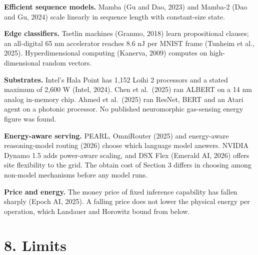 \documentclass[10pt,letterpaper]{article}
\begin{document}
\textbf{Efficient sequence models.} Mamba (Gu and Dao, 2023) and Mamba-2
(Dao and Gu, 2024) scale linearly in sequence length with constant-size
state.

\textbf{Edge classifiers.} Tsetlin machines (Granmo, 2018) learn
propositional clauses; an all-digital 65 nm accelerator reaches 8.6 nJ
per MNIST frame (Tunheim et al., 2025). Hyperdimensional computing
(Kanerva, 2009) computes on high-dimensional random vectors.

\textbf{Substrates.} Intel's Hala Point has 1,152 Loihi 2 processors and
a stated maximum of 2,600 W (Intel, 2024). Chen et al.~(2025) ran ALBERT
on a 14 nm analog in-memory chip. Ahmed et al.~(2025) ran ResNet, BERT
and an Atari agent on a photonic processor. No published neuromorphic
gas-sensing energy figure was found.

\textbf{Energy-aware serving.} PEARL, OmniRouter (2025) and energy-aware
reasoning-model routing (2026) choose which language model answers.
NVIDIA Dynamo 1.5 adds power-aware scaling, and DSX Flex (Emerald AI,
2026) offers site flexibility to the grid. The obtain cost of Section 3
differs in choosing among non-model mechanisms before any model runs.

\textbf{Price and energy.} The money price of fixed inference capability
has fallen sharply (Epoch AI, 2025). A falling price does not lower the
physical energy per operation, which Landauer and Horowitz bound from
below.

\section{8. Limits}\label{limits}
\end{document}
